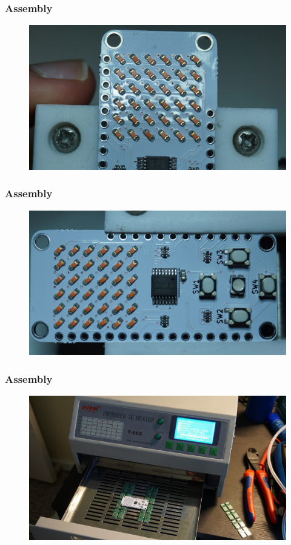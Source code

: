 \documentclass[t]{beamer}
\begin{document}
\begin{frame}
	\frametitle{Assembly}
	\begin{figure}
		\includegraphics[width=\linewidth]{assembly/assm11.JPG}
	\end{figure}
\end{frame}
\begin{frame}
	\frametitle{Assembly}
	\begin{figure}
		\includegraphics[width=\linewidth]{assembly/assm12.JPG}
	\end{figure}
\end{frame}
\begin{frame}
	\frametitle{Assembly}
	\begin{figure}
		\includegraphics[width=\linewidth]{assembly/assm9.JPG}
	\end{figure}
\end{frame}
\end{document}

